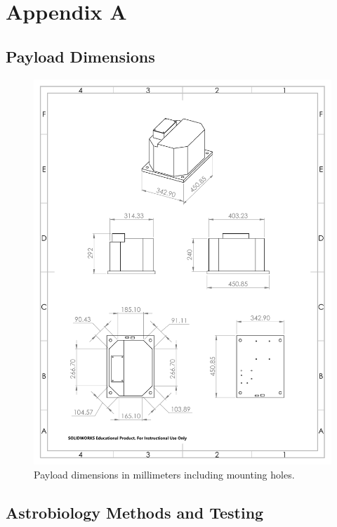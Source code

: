 \newpage
\section{Appendix A}
\label{sec:Appendix A}

\subsection{Payload Dimensions}
\begin{figure}[!h]
\begin{center}
\includegraphics[scale=.6]{./Figures/Payload_Dim.PDF}
\caption{Payload dimensions in millimeters including mounting holes.}
\label{fig:payload_dim}
\end{center}
\end{figure}

\newpage
\subsection{Astrobiology Methods and Testing}

